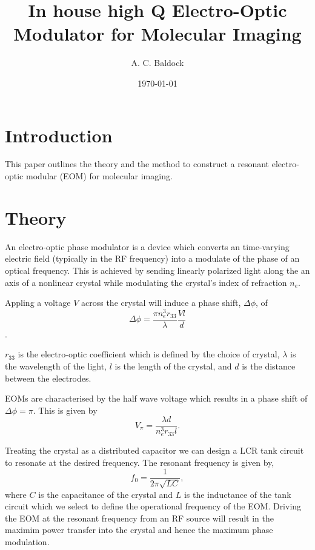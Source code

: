 \documentclass{article}
\title{In house high Q Electro-Optic Modulator for Molecular Imaging }
\author{A. C. Baldock}
\date{\today}
\begin{document}
\maketitle

\begin{abstract}
\end{abstract}

\section{Introduction}
This paper outlines the theory and the method to construct a resonant
electro-optic modular (EOM) for molecular imaging. 

\section{Theory}
An electro-optic phase modulator is a device which converts an time-varying
electric field (typically in the RF frequency) into a modulate of the phase of an
optical frequency. This is achieved by sending linearly polarized light along
the an axis of a nonlinear crystal while modulating the crystal's index of
refraction \(n_e\).

Appling a voltage $V$ across the crystal will induce a phase shift, \(\Delta\phi\), of~\cite{Mok}
\begin{equation}
    \Delta\phi = \frac{\pi n_e^3r_{33}}{\lambda}\frac{V l}{d}
    \label{eq:phase_shift}
\end{equation}.

$r_{33}$ is the electro-optic coefficient which is defined by the choice of crystal, \(\lambda\) is the wavelength of the
light, \(l\) is the length of the crystal, and \(d\) is the distance between the
electrodes.

EOMs are characterised by the half wave voltage which results in a phase shift of \(\Delta\phi=\pi\). This is given by
\begin{equation}
    V_{\pi} = \frac{\lambda d}{n_e^3r_{33}l}.
    \label{eq:half_wave_voltage}
\end{equation}

Treating the crystal as a distributed capacitor we can design a LCR tank circuit
to resonate at the desired frequency. The resonant frequency is given by,
\begin{equation}
    f_0 = \frac{1}{2\pi\sqrt{LC}},
    \label{eq:resonant_frequency}
\end{equation}
where \(C\) is the capacitance of the crystal and \(L\) is the inductance of the
tank circuit which we select to define the operational frequency of the EOM.
Driving the EOM at the resonant frequency from an RF source will result in the 
maximim power transfer into the crystal and hence the maximum phase modulation.
\end{document}
